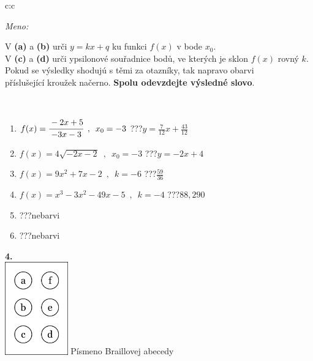 \documentclass[10pt]{report}
\begin{document}
\begin{tabular}{c:c}
\begin{minipage}[c][104.5mm][t]{0.5\linewidth}
\begin{center}
\textit{Meno:}\phantom{xxxxxxxxxxxxxxxxxxxxxxxxxxxxxxxxxxxxxxxxxxxxxxxxxxxxxxxxxxxxxxxxx}\\[5mm]
\begin{minipage}{0.95\linewidth}
\begin{center}
V \textbf{(a)} a \textbf{(b)} urči  $y = kx + q$ ku funkci $f(x)$ v bode $x_0$.\\V \textbf{(c)} a \textbf{(d)} urči ypsilonové souřadnice bodů, ve kterých je sklon $f(x)$ rovný $k$.\\Pokud se výsledky shodujú s těmi za otazníky, tak napravo obarvi\\příslušející kroužek načerno. \textbf{Spolu odevzdejte výsledné slovo}.
\end{center}
\end{minipage}
\\[1mm]
\begin{minipage}{0.79\linewidth}
\begin{center}
\begin{varwidth}{\linewidth}
\begin{enumerate}
\small
\item $f(x)=\cfrac{-2x+5}{-3x-3}\enspace , \enspace x_0=-3$\quad \dotfill\; ???\;\dotfill \quad $y = \frac{7}{12}x+\frac{43}{12}$
\item $f(x)=4\sqrt{-2x-2}\enspace , \enspace x_0=-3$\quad \dotfill\; ???\;\dotfill \quad $y = -2x+4$
\item $f(x)=9x^2+7x-2\enspace , \enspace k=-6$\quad \dotfill\; ???\;\dotfill \quad $\frac{59}{36}$
\item $f(x)=x^3-3x^2-49x-5\enspace , \enspace k=-4$\quad \dotfill\; ???\;\dotfill \quad $88 , 290$
\item \quad \dotfill\; ???\;\dotfill \quad nebarvi
\item \quad \dotfill\; ???\;\dotfill \quad nebarvi
\end{enumerate}
\end{varwidth}
\end{center}
\end{minipage}
\begin{minipage}{0.20\linewidth}
\begin{center}
{\Huge\bfseries 4.} \\[2mm]
\includegraphics[height=40mm]{../images/braille.png}
{\small Písmeno Braillovej abecedy}
\end{center}
\end{minipage}
\end{center}
\end{minipage}
%
\end{tabular}
\end{document}
